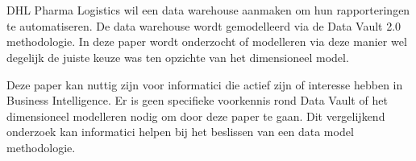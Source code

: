 
%
%

%



\chapter*{}

DHL Pharma Logistics wil een data warehouse aanmaken om hun rapporteringen te automatiseren. De data warehouse wordt gemodelleerd via de Data Vault 2.0 methodologie. In deze paper wordt onderzocht of modelleren via deze manier wel degelijk de juiste keuze was ten opzichte van het dimensioneel model.

Deze paper kan nuttig zijn voor informatici die actief zijn of interesse hebben in Business Intelligence. Er is geen specifieke voorkennis rond Data Vault of het dimensioneel modelleren nodig om door deze paper te gaan. Dit vergelijkend onderzoek kan informatici helpen bij het beslissen van een data model methodologie.

